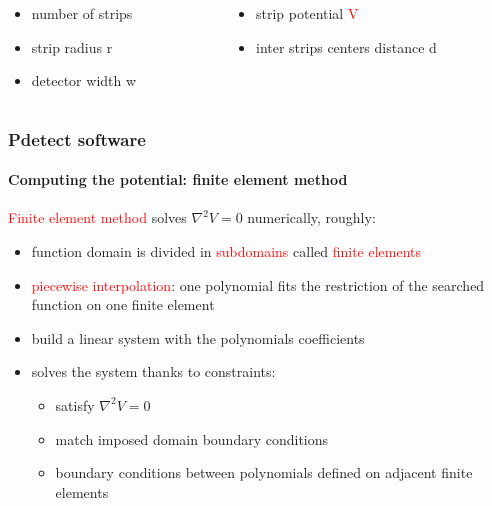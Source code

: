 \documentclass[14pt]{beamer}
\begin{document}
\begin{frame}
\begin{columns}
\begin{column}{0.5\textwidth}
    \begin{itemize}
      \item number of strips
      \item strip radius \textcolor{black!40!green}{r}
      \item detector width \textcolor{black!40!green}{w}
    \end{itemize}

  \end{column}

  \begin{column}{0.6\textwidth}
    \begin{itemize}
      \item strip potential \textcolor{red}{V}
      \item inter strips centers distance \textcolor{black!40!green}{d}
    \end{itemize}

  \end{column}
\end{columns}

\end{frame}

\begin{frame}
  \frametitle{Pdetect software}
  \framesubtitle{Computing the potential: finite element method}

  \fontsize{12pt}{7.2}\selectfont


\textcolor{red}{Finite element method} solves $\nabla^2 V = 0$
numerically, roughly:

\begin{itemize}
    \setlength\itemsep{1em}
  \item function domain is divided in \textcolor{red}{subdomains} called \textcolor{red}{finite elements}
  \item \textcolor{red}{piecewise interpolation}: one polynomial fits the restriction
  of the searched function on one finite element
  \item build a linear system with the polynomials coefficients
  \item solves the system thanks to constraints:
  \begin{itemize}
    \item satisfy $\nabla^2 V = 0$
    \item match imposed domain boundary conditions
    \item boundary conditions between polynomials defined on adjacent finite
    elements
    \end{itemize}
\end{itemize}

\end{frame}
\end{document}
